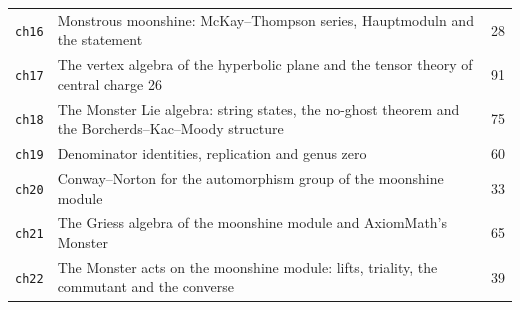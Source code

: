 {\begin{longtable}{l>{\raggedright\arraybackslash}p{}r}
\texttt{ch16} & Monstrous moonshine: McKay--Thompson series, Hauptmoduln and the statement & 28 \\
\texttt{ch17} & The vertex algebra of the hyperbolic plane and the tensor theory of central charge 26 & 91 \\
\texttt{ch18} & The Monster Lie algebra: string states, the no-ghost theorem and the Borcherds--Kac--Moody structure & 75 \\
\texttt{ch19} & Denominator identities, replication and genus zero & 60 \\
\texttt{ch20} & Conway--Norton for the automorphism group of the moonshine module & 33 \\
\texttt{ch21} & The Griess algebra of the moonshine module and AxiomMath's Monster & 65 \\
\texttt{ch22} & The Monster acts on the moonshine module: lifts, triality, the commutant and the converse & 39 \\
\bottomrule\end{longtable}}
